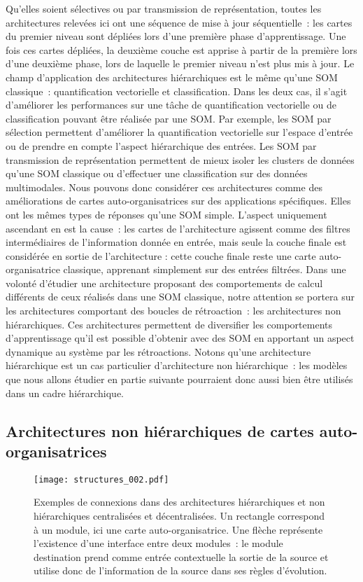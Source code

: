\documentclass[../main]{subfiles}
\begin{document}
Qu'elles soient sélectives ou par transmission de représentation, toutes les architectures relevées ici ont une séquence de mise à jour séquentielle~: les cartes du premier niveau sont dépliées lors d'une première phase d'apprentissage. Une fois ces cartes dépliées, la deuxième couche est apprise à partir de la première lors d'une deuxième phase, lors de laquelle le premier niveau n'est plus mis à jour.
Le champ d'application des architectures hiérarchiques est le même qu'une SOM classique~: quantification vectorielle et classification.
Dans les deux cas, il s'agit d'améliorer les performances sur une tâche de quantification vectorielle ou de classification pouvant être réalisée par une SOM. 
Par exemple, les SOM par sélection permettent d'améliorer la quantification vectorielle sur l'espace d'entrée ou de prendre en compte l'aspect hiérarchique des entrées. Les SOM par transmission de représentation permettent de mieux isoler les clusters de données qu'une SOM classique ou d'effectuer une classification sur des données multimodales.
Nous pouvons donc considérer ces architectures comme des améliorations de cartes auto-organisatrices sur des applications spécifiques.
Elles ont les mêmes types de réponses qu'une SOM simple.
L'aspect uniquement ascendant en est la cause~: les cartes de l'architecture agissent comme des filtres intermédiaires de l'information donnée en entrée, mais seule la couche finale est considérée en sortie de l'architecture : cette couche finale reste une carte auto-organisatrice classique, apprenant simplement sur des entrées filtrées.
Dans une volonté d'étudier une architecture proposant des comportements de calcul différents de ceux réalisés dans une SOM classique, notre attention se portera sur les architectures comportant des boucles de rétroaction~: les architectures non hiérarchiques.
Ces architectures permettent de diversifier les comportements d'apprentissage qu'il est possible d'obtenir avec des SOM en apportant un aspect dynamique au système par les rétroactions. 
Notons qu'une architecture hiérarchique est un cas particulier d'architecture non hiérarchique~: les modèles que nous allons étudier en partie suivante pourraient donc aussi bien être utilisés dans un cadre hiérarchique.


\subsection{Architectures non hiérarchiques de cartes auto-organisatrices}

\begin{figure}
    \centering\texttt{[image: structures\_002.pdf]}
    \caption{Exemples de connexions dans des architectures hiérarchiques et non hiérarchiques centralisées et décentralisées. Un rectangle correspond à un module, ici une carte auto-organisatrice. Une flèche représente l'existence d'une interface entre deux modules~: le module destination prend comme entrée contextuelle la sortie de la source et utilise donc de l'information de la source dans ses règles d'évolution. \label{fig:structure}}
    \end{figure}
\end{document}
